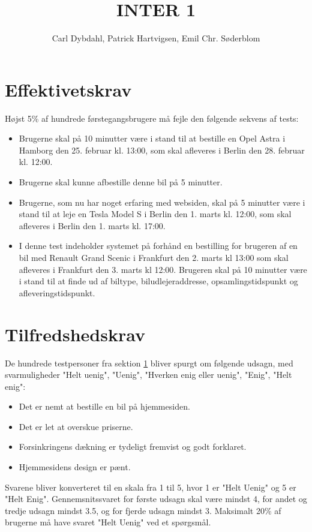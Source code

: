 \documentclass[a4paper]{article}
\title{INTER 1}
\author{Carl Dybdahl, Patrick Hartvigsen, Emil Chr. Søderblom}
\begin{document}
\maketitle

\section{Effektivetskrav} \label{efficiency}

Højst 5\% af hundrede førstegangsbrugere må fejle den følgende sekvens af tests:

\begin{itemize}
\item Brugerne skal på 10 minutter være i stand til at bestille en Opel Astra i Hamborg den 25. februar kl. 13:00, som skal afleveres i Berlin den 28. februar kl. 12:00.
\item Brugerne skal kunne afbestille denne bil på 5 minutter.
\item Brugerne, som nu har noget erfaring med websiden, skal på 5 minutter være i stand til at leje en Tesla Model S i Berlin den 1. marts kl. 12:00, som skal afleveres i Berlin den 1. marts kl. 17:00.
\item I denne test indeholder systemet på forhånd en bestilling for brugeren af en bil med Renault Grand Scenic i Frankfurt den 2. marts kl 13:00 som skal afleveres i Frankfurt den 3. marts kl 12:00. Brugeren skal på 10 minutter være i stand til at finde ud af biltype, biludlejeraddresse, opsamlingstidspunkt og afleveringstidspunkt.
\end{itemize}

\section{Tilfredshedskrav}

De hundrede testpersoner fra sektion \ref{efficiency} bliver spurgt om følgende udsagn, med svarmuligheder "Helt uenig", "Uenig", "Hverken enig eller uenig", "Enig", "Helt enig":

\begin{itemize}
\item Det er nemt at bestille en bil på hjemmesiden.
\item Det er let at overskue priserne.
\item Forsinkringens dækning er tydeligt fremvist og godt forklaret.
\item Hjemmesidens design er pænt.
\end{itemize}

Svarene bliver konverteret til en skala fra 1 til 5, hvor 1 er "Helt Uenig" og 5 er "Helt Enig". Gennemsnitssvaret for første udsagn skal være mindst 4, for andet og tredje udsagn mindst 3.5, og for fjerde udsagn mindst 3. Maksimalt 20\% af brugerne må have svaret "Helt Uenig" ved et spørgsmål.
\end{document}
